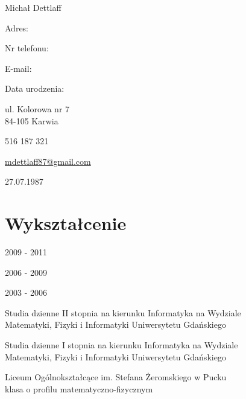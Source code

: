 \documentclass[letterpaper]{article}
\def\name{Michał Dettlaff}
\renewenvironment{itemize}{
  \begin{list}{}{
    \setlength{\leftmargin}{1.5em}
  }
}{
  \end{list}
}
\begin{document}
{\huge \name}


\vspace{0.32in}

\begin{minipage}{0.30\linewidth}
  \begin{itemize}
    \item Adres:\\
    \item Nr telefonu:
    \item E-mail:
    \item Data urodzenia:
  \end{itemize}
\end{minipage}
\begin{minipage}{0.70\linewidth}
  \begin{itemize}
    \item ul. Kolorowa nr 7\\
    84-105 Karwia
    \item 516 187 321
    \item \href{mailto:mdettlaff87@gmail.com}{mdettlaff87@gmail.com}
    \item 27.07.1987
  \end{itemize}
\end{minipage}

\vspace{0.10in}

\section*{Wykształcenie}

\begin{minipage}{0.30\linewidth}
  \begin{itemize}
    \item 2009 - 2011\\
    \item 2006 - 2009\\
    \item 2003 - 2006\\
  \end{itemize}
\end{minipage}
\begin{minipage}{0.70\linewidth}
  \begin{itemize}
    \item Studia dzienne II stopnia na kierunku Informatyka na Wydziale\\
    Matematyki, Fizyki i Informatyki Uniwersytetu Gdańskiego
    \item Studia dzienne I stopnia na kierunku Informatyka na Wydziale\\
    Matematyki, Fizyki i Informatyki Uniwersytetu Gdańskiego
    \item Liceum Ogólnokształcące im. Stefana Żeromskiego w Pucku\\
    klasa o profilu matematyczno-fizycznym
  \end{itemize}
\end{minipage}
\end{document}
